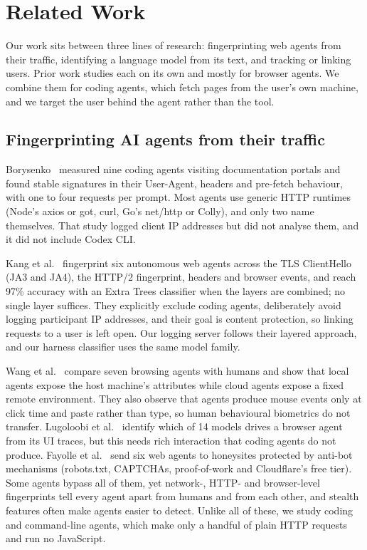 
\section{Related Work}
\label{sec:related}

Our work sits between three lines of research: fingerprinting web agents from their traffic,
identifying a language model from its text, and tracking or linking users. Prior work studies each
on its own and mostly for browser agents. We combine them for coding agents, which fetch pages from
the user's own machine, and we target the user behind the agent rather than the tool.

\subsection{Fingerprinting AI agents from their traffic}

Borysenko~\cite{borysenko2026agents} measured nine coding agents visiting documentation portals and
found stable signatures in their User-Agent, headers and pre-fetch behaviour, with one to four
requests per prompt. Most agents use generic HTTP runtimes (Node's axios or got, curl, Go's net/http
or Colly), and only two name themselves. That study logged client IP addresses but did not analyse
them, and it did not include Codex CLI.

Kang et al.~\cite{kang2026whose} fingerprint six autonomous web agents across the TLS ClientHello
(JA3 and JA4), the HTTP/2 fingerprint, headers and browser events, and reach 97\% accuracy with an
Extra Trees classifier when the layers are combined; no single layer suffices. They explicitly
exclude coding agents, deliberately avoid logging participant IP addresses, and their goal is content
protection, so linking requests to a user is left open. Our logging server follows their layered
approach, and our harness classifier uses the same model family.

Wang et al.~\cite{wang2026fpagent} compare seven browsing agents with humans and show that local
agents expose the host machine's attributes while cloud agents expose a fixed remote environment.
They also observe that agents produce mouse events only at click time and paste rather than type, so
human behavioural biometrics do not transfer. Lugoloobi et al.~\cite{lugoloobi2026actions} identify
which of 14 models drives a browser agent from its UI traces, but this needs rich interaction that
coding agents do not produce. Fayolle et al.~\cite{fayolle2026browser} send six web agents to
honeysites protected by anti-bot mechanisms (robots.txt, CAPTCHAs, proof-of-work and Cloudflare's
free tier). Some agents bypass all of them, yet network-, HTTP- and browser-level fingerprints tell
every agent apart from humans and from each other, and stealth features often make agents easier to
detect. Unlike all of these, we study coding and command-line agents, which make only a handful of
plain HTTP requests and run no JavaScript.

